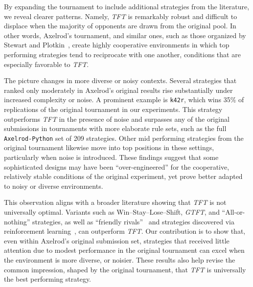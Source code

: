 \documentclass{article}
\newcommand{\TFT}{\emph{TFT}}
\newcommand{\GTFT}{\emph{GTFT}}
\newcommand{\AXL}{\texttt{Axelrod-Python}}
\begin{document}
By expanding the tournament to include additional strategies from the
literature, we reveal clearer patterns. Namely, \TFT{} is remarkably robust and
difficult to displace when the majority of opponents are drawn from the original
pool. In other words, Axelrod's tournament, and similar ones, such as those
organized by Stewart and Plotkin~\cite{Stewart2012}, create highly cooperative
environments in which top performing strategies tend to reciprocate with one
another, conditions that are especially favorable to \TFT.

The picture changes in more diverse or noisy contexts. Several strategies
that ranked only moderately in Axelrod's original results rise substantially
under increased complexity or noise. A prominent example is \texttt{k42r}, which
wins 35\% of replications of the original tournament in our experiments. This
strategy outperforms \TFT{} in the presence of noise and surpasses any of the
original submissions in tournaments with more elaborate rule sets, such as the
full \AXL{} set of 209 strategies. Other mid performing strategies from the
original tournament likewise move into top positions in these settings,
particularly when noise is introduced. These findings suggest that some
sophisticated designs may have been ``over-engineered'' for the cooperative,
relatively stable conditions of the original experiment, yet prove better
adapted to noisy or diverse environments.

This observation aligns with a broader literature showing that \TFT{} is not
universally optimal. Variants such as
Win--Stay--Lose--Shift, \GTFT, and ``All-or-nothing''
strategies, as well as ``friendly rivals''~\cite{murase2020five} and strategies
discovered via reinforcement learning~\cite{Knight2017}, can outperform \TFT{}.
Our contribution is to show that, even within Axelrod's original submission set,
strategies that received little attention due to modest performance in the
original tournament can excel when the environment is more diverse, or noisier.
These results also help revise the common impression, shaped by the original
tournament, that \TFT{} is universally the best performing strategy.
\end{document}
